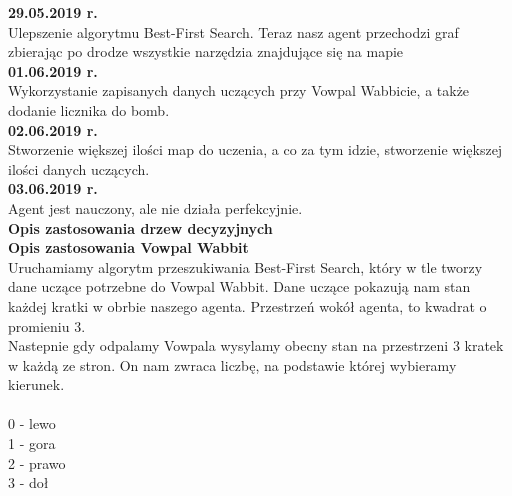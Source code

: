 \documentclass[12pt]{article}
\newcounter{coun}[section]
\begin{document}
\noindent\textbf{29.05.2019 r.}
\setcounter{coun}{0}\\

Ulepszenie algorytmu Best-First Search. Teraz nasz agent przechodzi graf zbierając po drodze wszystkie narzędzia znajdujące się na mapie\\

\noindent\textbf{01.06.2019 r.}
\setcounter{coun}{0}\\

Wykorzystanie zapisanych danych uczących przy Vowpal Wabbicie, a także dodanie licznika do bomb.\\

\noindent\textbf{02.06.2019 r.}
\setcounter{coun}{0}\\

Stworzenie większej ilości map do uczenia, a co za tym idzie, stworzenie większej ilości danych uczących.\\

\noindent\textbf{03.06.2019 r.}
\setcounter{coun}{0}\\

Agent jest nauczony, ale nie działa perfekcyjnie.\\

\noindent \textbf{Opis zastosowania drzew decyzyjnych}\\


\noindent \textbf{Opis zastosowania Vowpal Wabbit}\\


Uruchamiamy algorytm przeszukiwania Best-First Search, który w tle tworzy dane uczące potrzebne do Vowpal Wabbit. Dane uczące pokazują nam stan każdej kratki w obrbie naszego agenta. Przestrzeń wokół agenta, to kwadrat o promieniu 3. \\ 

Nastepnie gdy odpalamy Vowpala wysylamy obecny stan na przestrzeni 3 kratek w każdą ze stron. On nam zwraca liczbę, na podstawie której wybieramy kierunek. \\ \\ 
0 - lewo \\
1 - gora \\ 
2 - prawo \\
3 - doł \\
\end{document}
